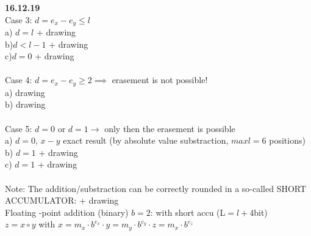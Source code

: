 \documentclass[a4paper, 11pt]{report}
\theoremstyle{break}
\theoremstyle{proofstyle}
\begin{document}
    
    \textbf{16.12.19} \\
    Case 3: $d=e_x-e_y\leqslant l$ \\
    a) $d=l$ + drawing \\
    b)$d<l-1$ + drawing \\
    c)$d=0$ + drawing \\
    \\
    
    Case 4: $d=e_x-e_y\geqslant 2 \implies $ erasement is not possible! \\
    a) drawing \\
    b) drawing \\
    \\
    
    Case 5: $d=0$ or $d=1 \to $ only then the erasement is possible \\
    a) $d=0$, $x-y$ exact result (by absolute value substraction, $max l=6$ positions) \\
    b) $d=1$ + drawing \\
    c) $d=1$ + drawing \\
    \\
    Note: The addition/substraction can be correctly rounded in a so-called SHORT ACCUMULATOR: + drawing \\
    Floating -point addition (binary) $b=2$: with short accu (L$=l+4$bit)\\
    $z=x\circ y$ with $x=m_x\cdot b^{e_x}\cdot y=m_y\cdot b^{e_y}\cdot z=m_x\cdot b^{e_z}$ \\
    \\
\end{document}
